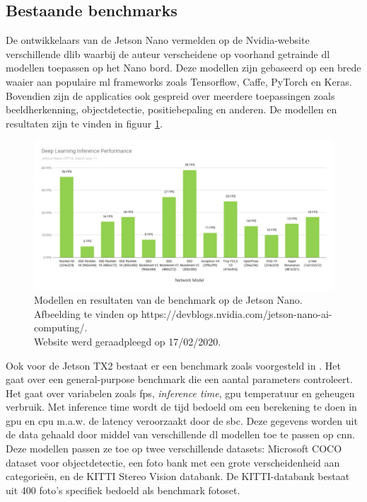 	\subsection{Bestaande benchmarks}
	De ontwikkelaars van de Jetson Nano vermelden op de Nvidia-website\cite{bron:nanobenchmark} verschillende \gls{dlib} waarbij de auteur verscheidene op voorhand getrainde \gls{dl} modellen toepassen op het Nano bord. Deze modellen zijn gebaseerd op een brede waaier aan populaire \gls{ml} frameworks zoals Tensorflow, Caffe, PyTorch en Keras. Bovendien zijn de applicaties ook gespreid over meerdere toepassingen zoals beeldherkenning, objectdetectie, positiebepaling en anderen. De modellen en resultaten zijn te vinden in figuur \ref{fig:nanobenchmark}.

	\begin{figure}
		\centering
		\includegraphics{afbeeldingen/NanoBenchmark.png}
		\caption{Modellen en resultaten van de benchmark op de Jetson Nano. \\Afbeelding te vinden op https://devblogs.nvidia.com/jetson-nano-ai-computing/.\\ Website werd geraadpleegd op 17/02/2020.}
		\label{fig:nanobenchmark}
	\end{figure}

	Ook voor de Jetson TX2 bestaat er een benchmark zoals voorgesteld in \cite{bordignonbenchmarking}. Het gaat over een general-purpose benchmark die een aantal parameters controleert. Het gaat over variabelen zoals \gls{fps}, \textit{inference time}, \gls{gpu} temperatuur en geheugen verbruik. Met inference time wordt de tijd bedoeld om een berekening te doen in \gls{gpu} en \gls{cpu} m.a.w. de latency veroorzaakt door de \gls{sbc}. Deze gegevens worden uit de data gehaald door middel van verschillende \gls{dl} modellen toe te passen op \gls{cnn}. Deze modellen passen ze toe op twee verschillende datasets: Microsoft COCO dataset voor objectdetectie, een foto bank met een grote verscheidenheid aan categorie\"en, en de KITTI Stereo Vision databank. De KITTI-databank bestaat uit 400 foto's specifiek bedoeld als benchmark fotoset.
	
